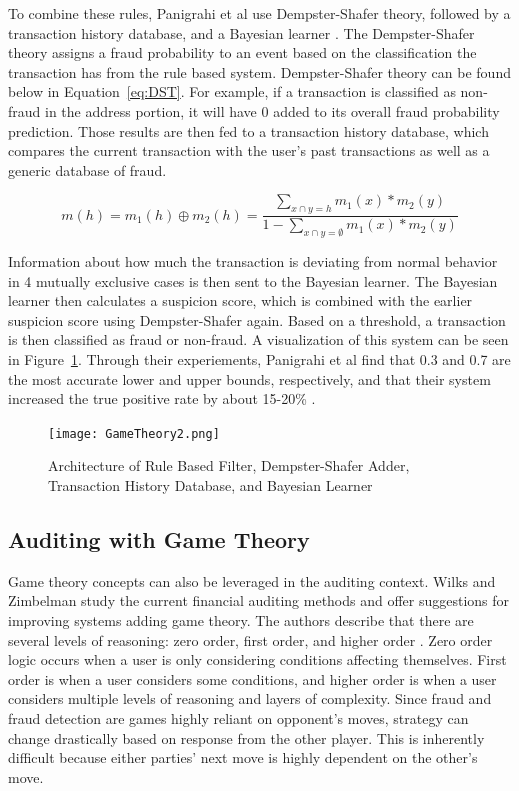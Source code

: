 \documentclass[midd]{thesis}
\begin{document}
To combine these rules, Panigrahi et al use Dempster-Shafer theory, followed by a transaction history database, and a Bayesian learner \cite{Panigrahi2009}. The Dempster-Shafer theory assigns a fraud probability to an event based on the classification the transaction has from the rule based system. Dempster-Shafer theory can be found below in Equation~\ref{eq:DST}.  For example, if a transaction is classified as non-fraud in the address portion, it will have 0 added to its overall fraud probability prediction. Those results are then fed to a transaction history database, which compares the current transaction with the user's past transactions as well as a generic database of fraud. 

\begin{equation}
\label{eq:DST}
m(h) = m_{1}(h)\oplus m_{2}(h) = {\frac {\sum _{x\cap y=h}m_{1}(x) * m_{2}(y)} {1 - \sum _{x\cap y=\emptyset }m_{1}(x) * m_{2}(y) }}
\end{equation}


Information about how much the transaction is deviating from normal behavior in 4 mutually exclusive cases is then sent to the Bayesian learner. The Bayesian learner then calculates a suspicion score, which is combined with the earlier suspicion score using Dempster-Shafer again. Based on a threshold, a transaction is then classified as fraud or non-fraud. A visualization of this system can be seen in Figure~\ref{fig:gametheory2}. Through their experiements, Panigrahi et al find that 0.3 and 0.7 are the most accurate lower and upper bounds, respectively, and that their system increased the true positive rate by about 15-20\% \cite{Panigrahi2009}. 


\begin{figure} \centering
  \texttt{[image: GameTheory2.png]}
  \caption{Architecture of Rule Based Filter, Dempster-Shafer Adder, Transaction History Database, and Bayesian Learner}
  \label{fig:gametheory2}
\end{figure}


\subsection{Auditing with Game Theory}

Game theory concepts can also be leveraged in the auditing context. Wilks and Zimbelman study the current financial auditing methods and offer suggestions for improving systems adding game theory. The authors describe that there are several levels of reasoning: zero order, first order, and higher order \cite{Wilks2004}. Zero order logic occurs when a user is only considering conditions affecting themselves. First order is when a user considers some conditions, and higher order is when a user considers multiple levels of reasoning and layers of complexity. Since fraud and fraud detection are games highly reliant on opponent's moves, strategy can change drastically based on response from the other player. This is inherently difficult because either parties' next move is highly dependent on the other's move. 
\end{document}
